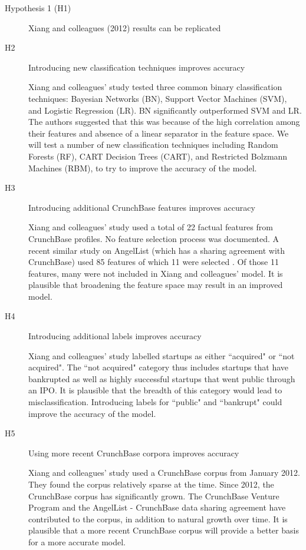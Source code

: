 \documentclass[12pt, a4paper]{article}
\begin{document}
\begin{description}
\item[Hypothesis 1 (H1)] Xiang and colleagues (2012) \cite{xiang2012} results can be replicated

\item[H2] Introducing new classification techniques improves accuracy

Xiang and colleagues' study tested three common binary classification techniques: Bayesian Networks (BN), Support Vector Machines (SVM), and Logistic Regression (LR). BN significantly outperformed SVM and LR. The authors suggested that this was because of the high correlation among their features and absence of a linear separator in the feature space. We will test a number of new classification techniques including Random Forests (RF), CART Decision Trees (CART), and Restricted Bolzmann Machines (RBM), to try to improve the accuracy of the model.

\item[H3] Introducing additional CrunchBase features improves accuracy

Xiang and colleagues' study used a total of 22 factual features from CrunchBase profiles. No feature selection process was documented. A recent similar study on AngelList (which has a sharing agreement with CrunchBase) used 85 features of which 11 were selected \cite{beckwith2016}. Of those 11 features, many were not included in Xiang and colleagues' model. It is plausible that broadening the feature space may result in an improved model.

\item[H4] Introducing additional labels improves accuracy

Xiang and colleagues' study labelled startups as either ``acquired" or ``not acquired". The ``not acquired" category thus includes startups that have bankrupted as well as highly successful startups that went public through an IPO. It is plausible that the breadth of this category would lead to misclassification. Introducing labels for ``public" and ``bankrupt" could improve the accuracy of the model.

\item[H5] Using more recent CrunchBase corpora improves accuracy

Xiang and colleagues' study used a CrunchBase corpus from January 2012. They found the corpus relatively sparse at the time. Since 2012, the CrunchBase corpus has significantly grown. The CrunchBase Venture Program and the AngelList - CrunchBase data sharing agreement have contributed to the corpus, in addition to natural growth over time. It is plausible that a more recent CrunchBase corpus will provide a better basis for a more accurate model.

\end{description}
\end{document}
